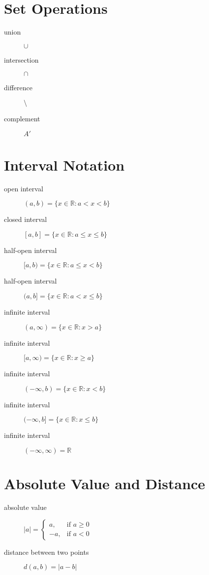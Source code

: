 \section{Set Operations}
\begin{description}
    \item[union] $\cup$
    \item[intersection] $\cap$
    \item[difference] $\setminus$
    \item[complement] $A'$
\end{description}

\section{Interval Notation}
\begin{description}
    \item[open interval] $(a, b) = \{x \in \mathbb{R} : a < x < b\}$
    \item[closed interval] $[a, b] = \{x \in \mathbb{R} : a \leq x \leq b\}$
    \item[half-open interval] $[a, b) = \{x \in \mathbb{R} : a \leq x < b\}$
    \item[half-open interval] $(a, b] = \{x \in \mathbb{R} : a < x \leq b\}$
    \item[infinite interval] $(a, \infty) = \{x \in \mathbb{R} : x > a\}$
    \item[infinite interval] $[a, \infty) = \{x \in \mathbb{R} : x \geq a\}$
    \item[infinite interval] $(-\infty, b) = \{x \in \mathbb{R} : x < b\}$
    \item[infinite interval] $(-\infty, b] = \{x \in \mathbb{R} : x \leq b\}$
    \item[infinite interval] $(-\infty, \infty) = \mathbb{R}$
\end{description}

\section{Absolute Value and Distance}
\begin{description}
    \item[absolute value] $|a| =
        \begin{cases}
            a, & \text{if } a \geq 0 \\
            -a, & \text{if } a < 0
        \end{cases}$
    \item[distance between two points] $d(a, b) = |a - b|$
\end{description}

